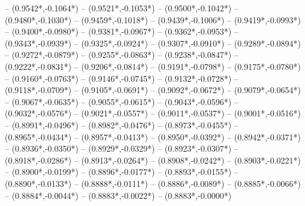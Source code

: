 {	-- ({0.9542*\dx},{-0.1064*\dy})
	-- ({0.9521*\dx},{-0.1053*\dy})
	-- ({0.9500*\dx},{-0.1042*\dy})
	-- ({0.9480*\dx},{-0.1030*\dy})
	-- ({0.9459*\dx},{-0.1018*\dy})
	-- ({0.9439*\dx},{-0.1006*\dy})
	-- ({0.9419*\dx},{-0.0993*\dy})
	-- ({0.9400*\dx},{-0.0980*\dy})
	-- ({0.9381*\dx},{-0.0967*\dy})
	-- ({0.9362*\dx},{-0.0953*\dy})
	-- ({0.9343*\dx},{-0.0939*\dy})
	-- ({0.9325*\dx},{-0.0924*\dy})
	-- ({0.9307*\dx},{-0.0910*\dy})
	-- ({0.9289*\dx},{-0.0894*\dy})
	-- ({0.9272*\dx},{-0.0879*\dy})
	-- ({0.9255*\dx},{-0.0863*\dy})
	-- ({0.9238*\dx},{-0.0847*\dy})
	-- ({0.9222*\dx},{-0.0831*\dy})
	-- ({0.9206*\dx},{-0.0814*\dy})
	-- ({0.9191*\dx},{-0.0798*\dy})
	-- ({0.9175*\dx},{-0.0780*\dy})
	-- ({0.9160*\dx},{-0.0763*\dy})
	-- ({0.9146*\dx},{-0.0745*\dy})
	-- ({0.9132*\dx},{-0.0728*\dy})
	-- ({0.9118*\dx},{-0.0709*\dy})
	-- ({0.9105*\dx},{-0.0691*\dy})
	-- ({0.9092*\dx},{-0.0672*\dy})
	-- ({0.9079*\dx},{-0.0654*\dy})
	-- ({0.9067*\dx},{-0.0635*\dy})
	-- ({0.9055*\dx},{-0.0615*\dy})
	-- ({0.9043*\dx},{-0.0596*\dy})
	-- ({0.9032*\dx},{-0.0576*\dy})
	-- ({0.9021*\dx},{-0.0557*\dy})
	-- ({0.9011*\dx},{-0.0537*\dy})
	-- ({0.9001*\dx},{-0.0516*\dy})
	-- ({0.8991*\dx},{-0.0496*\dy})
	-- ({0.8982*\dx},{-0.0476*\dy})
	-- ({0.8973*\dx},{-0.0455*\dy})
	-- ({0.8965*\dx},{-0.0434*\dy})
	-- ({0.8957*\dx},{-0.0413*\dy})
	-- ({0.8950*\dx},{-0.0392*\dy})
	-- ({0.8942*\dx},{-0.0371*\dy})
	-- ({0.8936*\dx},{-0.0350*\dy})
	-- ({0.8929*\dx},{-0.0329*\dy})
	-- ({0.8923*\dx},{-0.0307*\dy})
	-- ({0.8918*\dx},{-0.0286*\dy})
	-- ({0.8913*\dx},{-0.0264*\dy})
	-- ({0.8908*\dx},{-0.0242*\dy})
	-- ({0.8903*\dx},{-0.0221*\dy})
	-- ({0.8900*\dx},{-0.0199*\dy})
	-- ({0.8896*\dx},{-0.0177*\dy})
	-- ({0.8893*\dx},{-0.0155*\dy})
	-- ({0.8890*\dx},{-0.0133*\dy})
	-- ({0.8888*\dx},{-0.0111*\dy})
	-- ({0.8886*\dx},{-0.0089*\dy})
	-- ({0.8885*\dx},{-0.0066*\dy})
	-- ({0.8884*\dx},{-0.0044*\dy})
	-- ({0.8883*\dx},{-0.0022*\dy})
	-- ({0.8883*\dx},{-0.0000*\dy})
}
